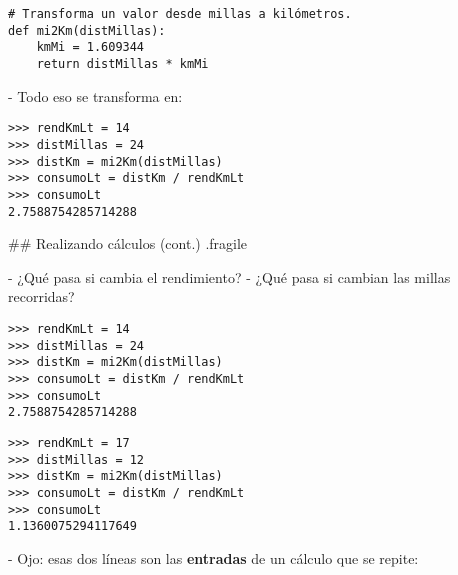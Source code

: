 

\begin{lstlisting}[linebackgroundcolor={%
        \btLstHL{2-4}%
}]
# Transforma un valor desde millas a kilómetros.
def mi2Km(distMillas):
    kmMi = 1.609344
    return distMillas * kmMi
\end{lstlisting}

\trmcolumns

\pause

- Todo eso se transforma en:

\vspace{-2ex}

\bgncolumns
{}
\begin{lstlisting}[linebackgroundcolor={%
        \btLstHL{3}%
}]
>>> rendKmLt = 14
>>> distMillas = 24
>>> distKm = mi2Km(distMillas)
>>> consumoLt = distKm / rendKmLt
>>> consumoLt
2.7588754285714288
\end{lstlisting}


\trmcolumns

## Realizando cálculos (cont.) {.fragile}

\bgnblocknormal

- ¿Qué pasa si cambia el rendimiento?
- ¿Qué pasa si cambian las millas recorridas?

\trmblocknormal

\bgncolumns
{}
\begin{lstlisting}[linebackgroundcolor={%
        \btLstHL{1-2}%
}]
>>> rendKmLt = 14
>>> distMillas = 24
>>> distKm = mi2Km(distMillas)
>>> consumoLt = distKm / rendKmLt
>>> consumoLt
2.7588754285714288
\end{lstlisting}

\begin{lstlisting}[linebackgroundcolor={\btLstHL{1-2}}]
>>> rendKmLt = 17
>>> distMillas = 12
>>> distKm = mi2Km(distMillas)
>>> consumoLt = distKm / rendKmLt
>>> consumoLt
1.1360075294117649
\end{lstlisting}

\trmcolumns

\bgncolumns
{}

- Ojo: esas dos líneas son las \textbf{entradas} de un cálculo que se repite:



